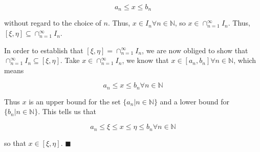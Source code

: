 \documentclass[paper=a4, fontsize=11pt]{scrartcl} %
\numberwithin{equation}{section} %
\numberwithin{figure}{section} %
\numberwithin{table}{section} %
\begin{document}
\begin{equation}
a_n \leq x \leq b_n
\end{equation}

without regard to the choice of $n$. Thus, $x \in I_n \forall n \in \mathbb{N}$, so $x \in \cap_{n=1}^{\infty} I_n$. Thus, $[\xi, \eta] \subseteq \cap_{n=1}^{\infty} I_n$.

\newcommand{\xieta}{[\xi,\eta]}
\newcommand{\capin}{\cap_{n=1}^{\infty} I_n}
\newcommand{\fanin}{\forall n \in \mathbb{N}}
In order to establish that $\xieta = \capin$, we are now obliged to show that $\capin \subseteq \xieta$. Take $x \in \capin$, we know that $x \in [a_n, b_n] \fanin$, which means

\begin{equation}
a_n \leq x \leq b_n \fanin
\end{equation}

Thus $x$ is an upper bound for the set $\{a_n | n \in \mathbb{N}\}$ and a lower bound for $\{b_n | n \in \mathbb{N}\}$. This tells us that

\begin{equation}
a_n \leq \xi \leq x \leq \eta \leq b_n \fanin
\end{equation}

so that $x \in \xieta$. $\blacksquare$\\
\end{document}
